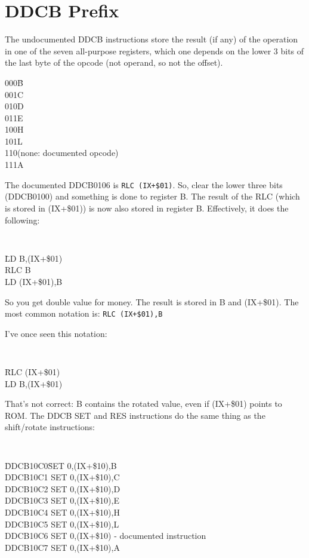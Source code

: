 \documentclass[oneside,a4paper]{book}
\begin{document}
\section{DDCB Prefix}
\label{prefix_cbdd}

The undocumented DDCB instructions store the result (if any) of the operation in one of the seven all-purpose registers, which one depends on the lower 3 bits of the last byte of the opcode (not operand, so not the offset).

\begin{tabbing}
	{\qquad}000\quad\=B\\
	{\qquad}001\>C\\
	{\qquad}010\>D\\
	{\qquad}011\>E\\
	{\qquad}100\>H\\
	{\qquad}101\>L\\
	{\qquad}110\>(none: documented opcode)\\
	{\qquad}111\>A
\end{tabbing}

The documented DDCB0106 is {\tt RLC (IX+\$01)}. So, clear the lower three bits (DDCB0100) and something is done to register B. The result of the RLC (which is stored in (IX+\$01)) is now also stored in register B. Effectively, it does the following:

{\tt
	\begin{tabbing}
		{\qquad}\=LD B,(IX+\$01)\+\\
		RLC B\\
		LD (IX+\$01),B
	\end{tabbing}
}

So you get double value for money. The result is stored in B and (IX+\$01). The most common notation is: {\tt RLC (IX+\$01),B}

I've once seen this notation:
 
{\tt
	\begin{tabbing}
		{\qquad}\=RLC (IX+\$01)\+\\
		LD B,(IX+\$01)
	\end{tabbing}
}

That's not correct: B contains the rotated value, even if (IX+\$01) points to ROM. The DDCB SET and RES instructions do the same thing as the shift/rotate instructions:

{\tt 
	\begin{tabbing}
		{\qquad}\=DDCB10C0{\qquad}\=SET 0,(IX+\$10),B\+\\
		DDCB10C1	\>SET 0,(IX+\$10),C\\
		DDCB10C2	\>SET 0,(IX+\$10),D\\
		DDCB10C3	\>SET 0,(IX+\$10),E\\
		DDCB10C4	\>SET 0,(IX+\$10),H\\
		DDCB10C5	\>SET 0,(IX+\$10),L\\
		DDCB10C6	\>SET 0,(IX+\$10) {\rm - documented instruction}\\
		DDCB10C7	\>SET 0,(IX+\$10),A
	\end{tabbing}
}
\end{document}
